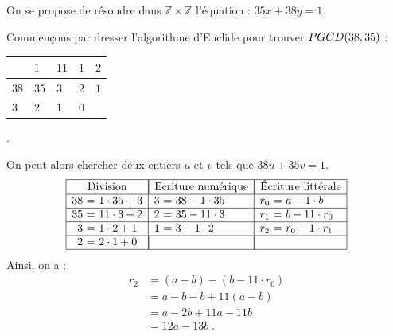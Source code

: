             \begin{ex}
                  On se propose de r\'esoudre dans $\mathbb{Z}\times\mathbb{Z}$ l'\'equation : 
                  $35 x + 38 y = 1$.
                  
                  Commen\c{c}ons par dresser l'algorithme d'Euclide pour trouver $PGCD(38,35)$ : \ 
                  \begin{tabular}{|l|l|l|l|l|} 
                  \hline
                             & $1$  & $11$ & $1$ & $2$ \\ 
                  \hline
                        $38$ & $35$ & $3$  & $2$ & $1$ \\ 
                  \hline
                        $3$  & $2$  & $1$  & $0$ &     \\
                  \hline
                  \end{tabular} .
                  
                  On peut alors chercher deux entiers $u$ et $v$ tels que $38 u + 35 v = 1$.
                                    \begin{displaymath}
                        \begin{array}{|r@{\ =\ }l|r@{\ =\ }l|r@{\ =\ }l|}
                              \hline
                              \multicolumn{2}{|c|}{\text{Division}} &
                                     \multicolumn{2}{|c|}{\text{Ecriture num\'erique} } & 
                                           \multicolumn{2}{|c|}{\text{\'Ecriture litt\'erale} } \\
                              \hline
                              38  & 1 \cdot 35 + 3 & 3 & 38 - 1 \cdot 35       & r_0  & a   - 1 \cdot b    \\
                              \hline
                              35  & 11 \cdot 3 + 2 & 2 & 35  - 11 \cdot 3      & r_1  & b   - 11 \cdot r_0 \\
                              \hline
                              3   & 1 \cdot 2 + 1  & 1  & 3  - 1 \cdot 2       & r_2  & r_0 - 1 \cdot r_1  \\
                              \hline
                              2  & 2 \cdot 1  + 0  & \multicolumn{2}{|c|}{}      & \multicolumn{2}{|c|}{}  \\
                              \hline
                        \end{array}
                  \end{displaymath}
                  Ainsi, on a : 
                        \begin{align*}
                              r_2 & = (a - b ) - (b - 11 \cdot r_0) \\
                                  & = a - b - b + 11 (a - b)        \\
                                  & = a - 2 b + 11 a - 11 b         \\
                                  & = 12 a - 13 b                   \;.
                        \end{align*}
                  

\end{ex}
